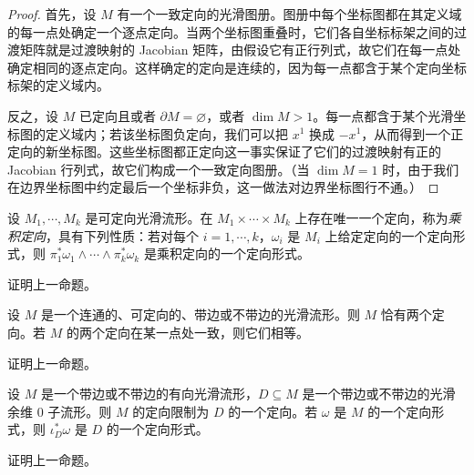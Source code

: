 \documentclass[../../main.tex]{subfiles}
\begin{document}
\begin{proof}
首先，设 $M$ 有一个一致定向的光滑图册。图册中每个坐标图都在其定义域的每一点处确定一个逐点定向。当两个坐标图重叠时，它们各自坐标标架之间的过渡矩阵就是过渡映射的 Jacobian 矩阵，由假设它有正行列式，故它们在每一点处确定相同的逐点定向。这样确定的定向是连续的，因为每一点都含于某个定向坐标标架的定义域内。

反之，设 $M$ 已定向且或者 $\partial M=\varnothing$，或者 $\dim M>1$。每一点都含于某个光滑坐标图的定义域内；若该坐标图负定向，我们可以把 $x^1$ 换成 $-x^1$，从而得到一个正定向的新坐标图。这些坐标图都正定向这一事实保证了它们的过渡映射有正的 Jacobian 行列式，故它们构成一个一致定向图册。（当 $\dim M=1$ 时，由于我们在边界坐标图中约定最后一个坐标非负，这一做法对边界坐标图行不通。）
\end{proof}

\begin{proposition}[乘积定向]\label{proposition:ch15-product-orientation}
设 $M_1,\cdots ,M_k$ 是可定向光滑流形。在 $M_1\times\cdots\times M_k$ 上存在唯一一个定向，称为\emph{乘积定向}，具有下列性质：若对每个 $i=1,\cdots ,k$，$\omega_i$ 是 $M_i$ 上给定定向的一个定向形式，则 $\pi_1^*\omega_1\wedge\cdots\wedge\pi_k^*\omega_k$ 是乘积定向的一个定向形式。
\end{proposition}

\begin{exercise}\label{exercise:ch15-08}
证明上一命题。
\end{exercise}

\begin{proposition}\label{proposition:ch15-two-orientations}
设 $M$ 是一个连通的、可定向的、带边或不带边的光滑流形。则 $M$ 恰有两个定向。若 $M$ 的两个定向在某一点处一致，则它们相等。
\end{proposition}

\begin{exercise}\label{exercise:ch15-10}
证明上一命题。
\end{exercise}

\begin{proposition}[余维 $0$ 子流形的定向]\label{proposition:ch15-codim0-orientation}
设 $M$ 是一个带边或不带边的有向光滑流形，$D\subseteq M$ 是一个带边或不带边的光滑余维 $0$ 子流形。则 $M$ 的定向限制为 $D$ 的一个定向。若 $\omega$ 是 $M$ 的一个定向形式，则 $\iota_D^*\omega$ 是 $D$ 的一个定向形式。
\end{proposition}

\begin{exercise}\label{exercise:ch15-12}
证明上一命题。
\end{exercise}
\end{document}
